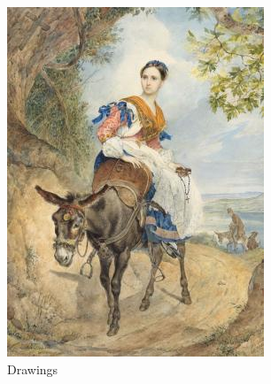 \begin{figure}[H]
    \centering
    \begin{subfigure}[t]{0.3\textwidth}
        \centering
        \includegraphics[width=\linewidth]{imagenes/dataset_examples/drawings.jpg}
        \caption*{Drawings}
    \end{subfigure}
    \begin{subfigure}[t]{0.3\textwidth}
        \centering

\end{subfigure}
\end{figure}
